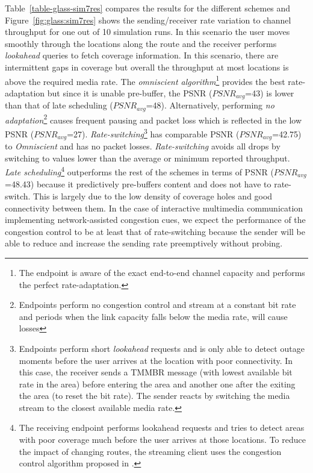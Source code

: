 Table~\ref{table-glass-sim7res} compares the results for the different schemes
and Figure~\ref{fig:glass:sim7res} shows the sending/receiver rate variation
to channel throughput for one out of 10 simulation runs. In this scenario the
user moves smoothly through the locations along the route and the receiver
performs \emph{lookahead} queries to fetch coverage information. In this
scenario, there are intermittent gaps in coverage but overall the throughput
at most locations is above the required media rate. The \emph{omniscient
algorithm}\footnote{The endpoint is aware of the exact end-to-end channel
capacity and performs the perfect rate-adaptation.} provides the best
rate-adaptation but since it is unable pre-buffer, the PSNR ($PSNR_{avg}$=43)
is lower than that of late scheduling ($PSNR_{avg}$=48). Alternatively,
performing \emph{no adaptation}\footnote{Endpoints perform no congestion
control and stream at a constant bit rate and periods when the link capacity
falls below the media rate, will cause losses} causes frequent pausing and
packet loss which is reflected in the low PSNR ($PSNR_{avg}$=27).
\emph{Rate-switching}\footnote{Endpoints perform short \emph{lookahead}
requests and is only able to detect outage moments before the user arrives at
the location with poor connectivity. In this case, the receiver sends a TMMBR
message (with lowest available bit rate in the area) before entering the area
and another one after the exiting the area (to reset the bit rate). The sender
reacts by switching the media stream to the closest available media rate.} has
comparable PSNR ($PSNR_{avg}$=42.75) to \emph{Omniscient} and has no packet
losses. \emph{Rate-switching} avoids all drops by switching to values lower
than the average or minimum reported throughput. \emph{Late
scheduling}\footnote{The receiving endpoint performs lookahead requests and
tries to detect areas with poor coverage much before the user arrives at those
locations. To reduce the impact of changing routes, the streaming client uses
the congestion control algorithm proposed in .} outperforms
the rest of the schemes in terms of PSNR ($PSNR_{avg}$=48.43) because it
predictively pre-buffers content and does not have to rate-switch. This is
largely due to the low density of coverage holes and good connectivity between
them. In the case of interactive multimedia communication implementing
network-assisted congestion cues, we expect the performance of the congestion
control to be at least that of rate-switching because the sender will be able
to reduce and increase the sending rate preemptively without probing.

